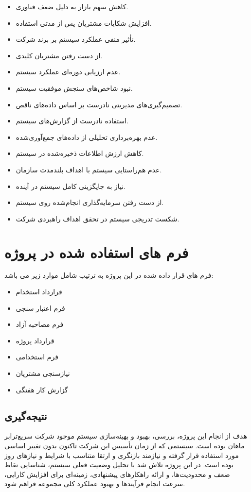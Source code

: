 \documentclass[12pt,a4paper]{report}
\begin{document}
\begin{itemize}
عدم تطابق سیستم با نیازهای جدید مشتریان.
\item
کاهش سهم بازار به دلیل ضعف فناوری.
\item
افزایش شکایات مشتریان پس از مدتی استفاده.
\item
تأثیر منفی عملکرد سیستم بر برند شرکت.
\item
از دست رفتن مشتریان کلیدی.
\item
عدم ارزیابی دوره‌ای عملکرد سیستم.
\item
نبود شاخص‌های سنجش موفقیت سیستم.
\item
تصمیم‌گیری‌های مدیریتی نادرست بر اساس داده‌های ناقص.
\item
استفاده نادرست از گزارش‌های سیستم.
\item
عدم بهره‌برداری تحلیلی از داده‌های جمع‌آوری‌شده.
\item
کاهش ارزش اطلاعات ذخیره‌شده در سیستم.
\item
عدم هم‌راستایی سیستم با اهداف بلندمدت سازمان.
\item
نیاز به جایگزینی کامل سیستم در آینده.
\item
از دست رفتن سرمایه‌گذاری انجام‌شده روی سیستم.
\item
شکست تدریجی سیستم در تحقق اهداف راهبردی شرکت.
\end{itemize}
\newpage
\chapter{فرم های استفاده شده در پروژه}

فرم های قرار داده شده در این پروژه به ترتیب شامل موارد زیر می باشد:
\begin{itemize}
	\item قرارداد استخدام
	\item فرم اعتبار سنجی 
	\item  فرم مصاحبه آزاد
	\item قرارداد پروژه
	\item فرم استخدامی
	\item نیازسنجی مشتریان
	\item گزارش کار هفتگی
\end{itemize}
\clearpage







\newpage
\section{نتیجه‌گیری}
هدف از انجام این پروژه، بررسی، بهبود و بهینه‌سازی سیستم موجود شرکت سریع‌ترابر ماهان بوده است. سیستمی که از زمان تأسیس این شرکت تاکنون بدون تغییر اساسی مورد استفاده قرار گرفته و نیازمند بازنگری و ارتقا متناسب با شرایط و نیازهای روز بوده است. در این پروژه تلاش شد با تحلیل وضعیت فعلی سیستم، شناسایی نقاط ضعف و محدودیت‌ها، و ارائه راهکارهای پیشنهادی، زمینه‌ای برای افزایش کارایی، سرعت انجام فرآیندها و بهبود عملکرد کلی مجموعه فراهم شود.
\end{document}
